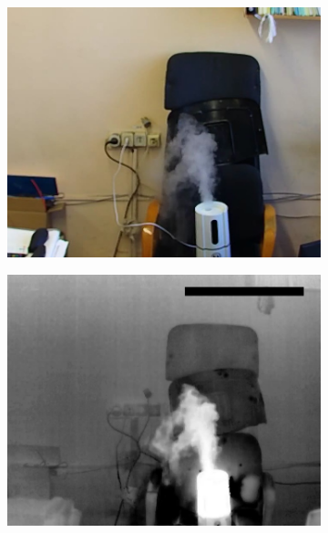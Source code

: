 \documentclass[14pt, a4paper]{extreport}
\begin{document}
	\begin{figure}[h!]
		\begin{subfigure}{.32\textwidth}
			\centering
			\includegraphics[width = \textwidth]{image/chapter_3/examples/img/206}
		\end{subfigure}
		\begin{subfigure}{.32\textwidth}
			\centering
			\includegraphics[width = \textwidth]{image/chapter_3/examples/tep/206}
		\end{subfigure}
		\begin{subfigure}{.32\textwidth}
			\centering

\end{subfigure}
\end{figure}
\end{document}
